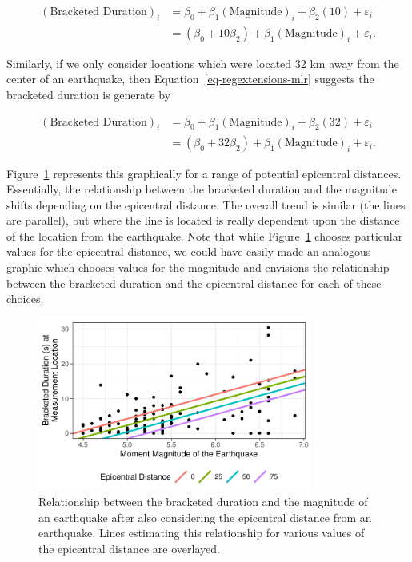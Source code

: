 \documentclass[
  letterpaper,
  DIV=11,
  numbers=noendperiod]{scrreprt}
\theoremstyle{plain}
\theoremstyle{definition}
\theoremstyle{definition}
\theoremstyle{remark}
\begin{document}
\[
\begin{aligned}
(\text{Bracketed Duration})_i 
  &= \beta_0 + \beta_1(\text{Magnitude})_i + \beta_2(10) + \varepsilon_i \\
  &= \left(\beta_0 + 10\beta_2\right) + \beta_1(\text{Magnitude})_i + \varepsilon_i.
\end{aligned}
\]

Similarly, if we only consider locations which were located 32 km away
from the center of an earthquake, then
Equation~\ref{eq-regextensions-mlr} suggests the bracketed duration is
generate by

\[
\begin{aligned}
(\text{Bracketed Duration})_i 
  &= \beta_0 + \beta_1(\text{Magnitude})_i + \beta_2(32) + \varepsilon_i \\
  &= \left(\beta_0 + 32\beta_2\right) + \beta_1(\text{Magnitude})_i + \varepsilon_i.
\end{aligned}
\]

Figure~\ref{fig-regextensions-mlr-plot} represents this graphically for
a range of potential epicentral distances. Essentially, the relationship
between the bracketed duration and the magnitude shifts depending on the
epicentral distance. The overall trend is similar (the lines are
parallel), but where the line is located is really dependent upon the
distance of the location from the earthquake. Note that while
Figure~\ref{fig-regextensions-mlr-plot} chooses particular values for
the epicentral distance, we could have easily made an analogous graphic
which chooses values for the magnitude and envisions the relationship
between the bracketed duration and the epicentral distance for each of
these choices.

\begin{figure}

{\centering \includegraphics[width=0.8\textwidth,height=\textheight]{./images/fig-regextensions-mlr-plot-1.pdf}

}

\caption{\label{fig-regextensions-mlr-plot}Relationship between the
bracketed duration and the magnitude of an earthquake after also
considering the epicentral distance from an earthquake. Lines estimating
this relationship for various values of the epicentral distance are
overlayed.}

\end{figure}
\end{document}
